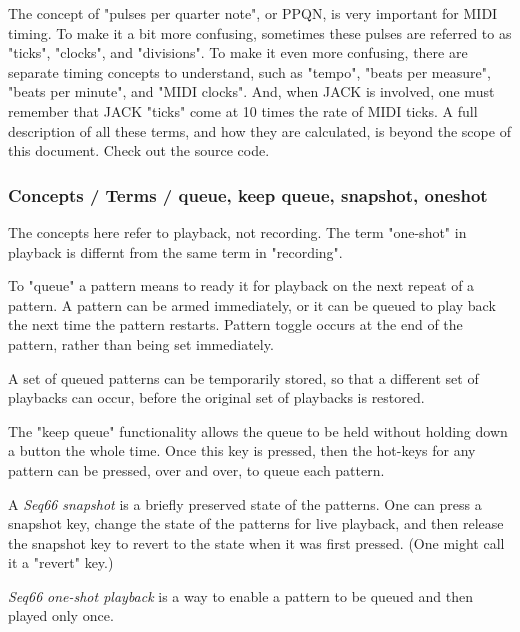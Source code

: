    The concept of "pulses per quarter note", or PPQN, is very important for
   MIDI timing.  To make it a bit more confusing, sometimes these pulses are
   referred to as "ticks", "clocks", and "divisions".
   To make it even more confusing, there are separate timing concepts to
   understand, such as "tempo", "beats per measure", "beats per minute", and
   "MIDI clocks".
   And, when JACK is involved, one must remember that JACK "ticks" come at 10
   times the rate of MIDI ticks.
   A full description of all these terms, and how they are calculated, is
   beyond the scope of this document.  Check out the source code.

\subsubsection{Concepts / Terms / queue, keep queue, snapshot, oneshot}
\label{subsubsec:concepts_terms_queue_mode}

   The concepts here refer to playback, not recording.  The term "one-shot" in
   playback is differnt from the same term in "recording".

   To "queue" a pattern means to ready it for playback on the next repeat of
   a pattern.  A pattern can be armed immediately, or it can be queued to
   play back the next time the pattern restarts.
   Pattern toggle occurs at the end of the pattern,
   rather than being set immediately.

   A set of queued patterns can be temporarily stored, so that a different
   set of playbacks can occur, before the original set of playbacks is
   restored.

   The "keep queue" functionality allows the queue to be held without
   holding down a button the whole time.  Once this key is pressed,
   then the hot-keys for any pattern can be pressed, over and over,
   to queue each pattern.

   A \textsl{Seq66} \textsl{snapshot} is a briefly preserved
   state of the patterns.  One can press a snapshot key, change the state of
   the patterns for live playback, and then release the snapshot key to
   revert to the state when it was first pressed.  (One might call it a
   "revert" key.)

   \textsl{Seq66} \textsl{one-shot playback} is a way to enable a pattern to be
   queued and then played only once.

